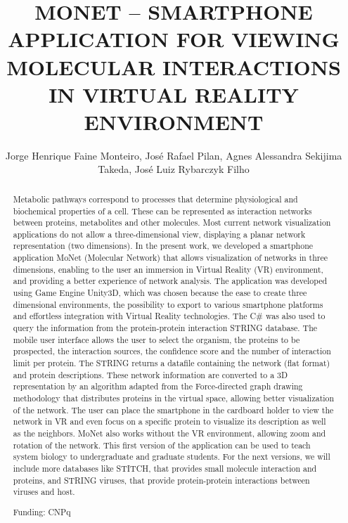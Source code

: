 \documentclass[twoside]{article}
\title{\vspace{-15mm}\fontsize{24pt}{10pt}\selectfont\textbf{ MONET – SMARTPHONE APPLICATION FOR VIEWING MOLECULAR INTERACTIONS IN VIRTUAL REALITY ENVIRONMENT }} %
\author{ Jorge Henrique Faine Monteiro, Jos\'e Rafael Pilan, Agnes Alessandra Sekijima Takeda, Jos\'e Luiz Rybarczyk Filho }
\affil{ Instituto de Bioci\^encias de Botucatu - UNESP }
\date{}
\begin{document}
  
  
  \maketitle %
  
  
  \thispagestyle{fancy} %
  
  
  \begin{abstract}
  Metabolic pathways correspond to processes that determine physiological and biochemical properties of a cell. These  can be represented as interaction networks between proteins,  metabolites and other molecules. Most current network visualization applications do not allow a three-dimensional view,  displaying a  planar network representation (two dimensions). In the present work,  we developed a smartphone application MoNet (Molecular Network) that allows visualization of networks in three dimensions,  enabling to the user an immersion in Virtual Reality (VR) environment,  and providing a better experience of network analysis. The application was developed using Game Engine Unity3D,  which was chosen because the ease to create three dimensional environments,  the possibility to export to various smartphone platforms and effortless integration with Virtual Reality technologies.  The C\# was also used to query the information from  the protein-protein interaction STRING database. The mobile user interface allows the user to select the organism,   the proteins to be prospected,  the interaction sources,  the confidence score and the number of interaction limit per protein. The STRING returns a datafile containing the network (flat format) and protein descriptions. These network information are converted to a 3D representation by an algorithm adapted from the Force-directed graph drawing methodology that distributes proteins in the virtual space,  allowing better visualization of the network. The user can place the smartphone in the cardboard holder to view the network in VR and even focus on a specific protein to visualize its description as well as the neighbors. MoNet also works without the VR environment,  allowing zoom and rotation of the network. This first version of the application can be used to teach system biology to undergraduate and graduate students. For the next versions,  we will include more databases like STITCH,  that provides small molecule interaction and proteins,  and STRING viruses,  that provide protein-protein interactions between viruses and host.
  
  Funding: CNPq \\ 
  \end{abstract}
  
\end{document}
